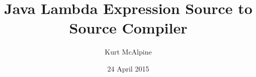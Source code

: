 \documentclass{report}
\begin{document}
\title{Java Lambda Expression Source to Source Compiler}
\author{Kurt McAlpine}
\date{24 April 2015}
\maketitle
\end{document}
